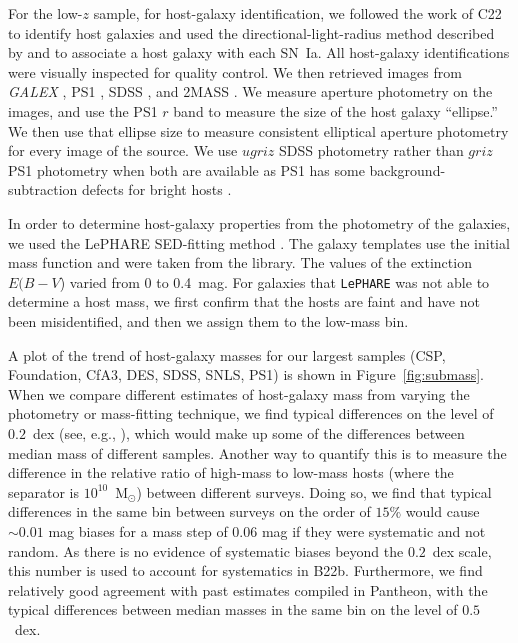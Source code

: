\documentclass[twocolumn]{aastex63}
\begin{document}
\noindent For the low-$z$ sample, for host-galaxy identification, we followed the work of C22 to identify host galaxies and used the directional-light-radius method described by \cite{Sullivan06} and \cite{Gupta16} to associate a host galaxy with each SN~Ia.  All host-galaxy identifications were visually inspected for quality control.  We then retrieved images from {\it GALEX} \citep{Galex05}, PS1 \citep{Chambers17}, SDSS \citep{Ahumada20}, and 2MASS \citep{2mass06}. We measure aperture photometry on the images, and use the PS1 $r$ band to measure the size of the host galaxy ``ellipse.''  We then use that ellipse size to measure consistent elliptical aperture photometry for every image of the source. We use $ugriz$ SDSS photometry rather than $griz$ PS1 photometry when both are available as PS1 has some background-subtraction defects for bright hosts \citep{Jones19}.

   
   
In order to determine host-galaxy properties from the photometry of the galaxies, we used the LePHARE SED-fitting method \citep{lephare06}. The galaxy templates use the \cite{Chabrier03} initial mass function and were taken from the \cite{Bruzal03} library. The values of the extinction $E(B-V$) varied from 0 to 0.4~mag. For galaxies that \texttt{LePHARE} was not able to determine a host mass, we first confirm that the hosts are faint and have not been misidentified, and then we assign them to the low-mass bin. 

A plot of the trend of host-galaxy masses for our largest samples (CSP, Foundation, CfA3, DES, SDSS, SNLS, PS1) is shown in Figure~\ref{fig:submass}.  When we compare different estimates of host-galaxy mass from varying the photometry or mass-fitting technique, we find typical differences on the level of $0.2$~dex (see, e.g., \citealp{Sako2018,Smith2020}), which would make up some of the differences between median mass of different samples. Another way to quantify this is to measure the difference in the relative ratio of high-mass to low-mass hosts (where the separator is $10^{10}$~M$_\odot$) between different surveys.  Doing so, we find that typical differences in the same bin between surveys on the order of $15\%$ would cause $\sim0.01$ mag biases for a mass step of $0.06$ mag if they were systematic and not random.  As there is no evidence of systematic biases beyond the $0.2$~dex scale, this number is used to account for systematics in B22b.  Furthermore, we find relatively good agreement with past estimates compiled in Pantheon, with the typical differences between median masses in the same bin on the level of $0.5$~dex.  
\end{document}
